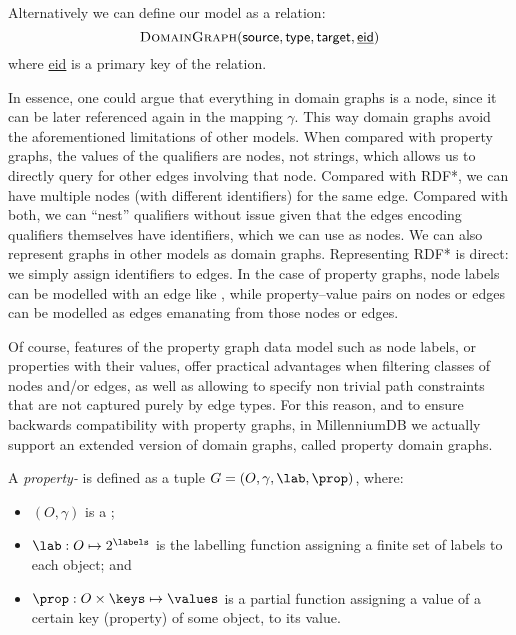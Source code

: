 Alternatively we can define our model as a relation:
\[\textsc{DomainGraph}(\textsf{source},\textsf{type},\textsf{target},\underline{\textsf{eid}}) \]
where \underline{\textsf{eid}} is a primary key of the relation. 

In essence, one could argue that everything in domain graphs is a node, since it can be later referenced again in the mapping $\gamma$. This way domain graphs avoid the aforementioned limitations of other models. When compared with property graphs, the values of the qualifiers are nodes, not strings, which allows us to directly query for other edges involving that node. Compared with RDF*, we can have multiple nodes (with different identifiers) for the same edge. Compared with both, we can ``nest'' qualifiers without issue given that the edges encoding qualifiers themselves have identifiers, which we can use as nodes. We can also represent graphs in other models as domain graphs. Representing RDF* is direct: we simply assign identifiers to edges. In the case of property graphs, node labels can be modelled with an edge like , while property--value pairs on nodes or edges can be modelled as edges emanating from those nodes or edges.


Of course, features of the property graph data model such as node labels, or properties with their values, offer practical advantages when filtering classes of nodes and/or edges, as well as allowing to specify non trivial path constraints that are not captured purely by edge \textsf{types}. For this reason, and to ensure backwards compatibility with property graphs, in MillenniumDB we actually support an extended version of domain graphs, called property domain graphs.

\begin{definition}
 A \emph{property-\data} is defined as a tuple $G=(O,\gamma,\lab,\prop)$, where:
\begin{itemize}
    \item $(O,\gamma)$ is a \data;
    \item $\lab : O \mapsto 2^\labels$ is the labelling function assigning a finite set of labels to each object; and
    \item $\prop : O \times \keys \mapsto \values$ is a partial function assigning a value of a certain key (property) of some object, to its value.
\end{itemize}
\end{definition}

